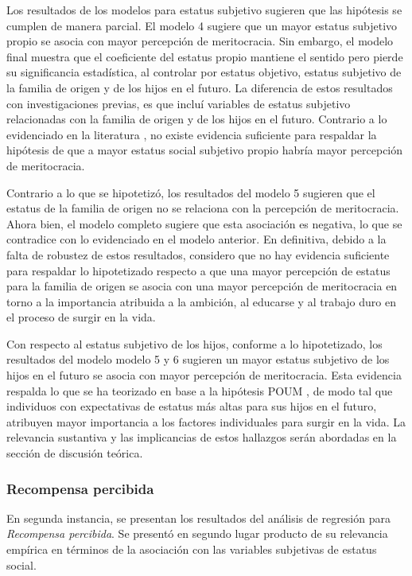 \documentclass[12pt]{article}
\begin{document}
Los resultados de los modelos para estatus subjetivo sugieren que las hipótesis se cumplen de manera parcial. El modelo 4 sugiere que un mayor estatus subjetivo propio se asocia con mayor percepción de meritocracia. Sin embargo, el modelo final muestra que el coeficiente del estatus propio mantiene el sentido pero pierde su significancia estadística, al controlar por estatus objetivo, estatus subjetivo de la familia de origen y de los hijos en el futuro. La diferencia de estos resultados con investigaciones previas, es que incluí variables de estatus subjetivo relacionadas con la familia de origen y de los hijos en el futuro. Contrario a lo evidenciado en la literatura \citep{Schneider2015,Castillo2018}, no existe evidencia suficiente para respaldar la hipótesis de que a mayor estatus social subjetivo propio habría mayor percepción de meritocracia. 	

Contrario a lo que se hipotetizó, los resultados del modelo 5 sugieren que el estatus de la familia de origen no se relaciona con la percepción de meritocracia. Ahora bien, el modelo completo sugiere que esta asociación es negativa, lo que se contradice con lo evidenciado en el modelo anterior. En definitiva, debido a la falta de robustez de estos resultados, considero que no hay evidencia suficiente para respaldar lo hipotetizado respecto a que una mayor percepción de estatus para la familia de origen se asocia con una mayor percepción de meritocracia en torno a la importancia atribuida a la ambición, al educarse y al trabajo duro en el proceso de surgir en la vida.  

Con respecto al estatus subjetivo de los hijos, conforme a lo hipotetizado, los resultados del modelo modelo 5 y 6 sugieren un mayor estatus subjetivo de los hijos en el futuro se asocia con mayor percepción de meritocracia. Esta evidencia respalda lo que se ha teorizado en base a la hipótesis POUM \citep{Benabou2001}, de modo tal que individuos con expectativas de estatus más altas para sus hijos en el futuro, atribuyen mayor importancia a los factores individuales para surgir en la vida. La relevancia sustantiva y las implicancias de estos hallazgos serán abordadas en la sección de discusión teórica.           

\subsubsection[Variable latente \textit{Recompensa percibida}]{Recompensa percibida}

En segunda instancia, se presentan los resultados del análisis de regresión para \textit{Recompensa percibida}. Se presentó en segundo lugar producto de su relevancia empírica en términos de la asociación con las variables subjetivas de estatus social. 
\end{document}
